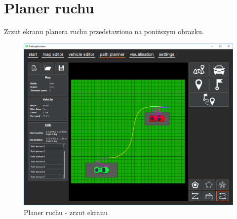 \documentclass[a4paper,11pt,twoside]{report}
\theoremstyle{definition}
\begin{document}
\section{Planer ruchu}

Zrzut ekranu planera ruchu przedstawiono na poniższym obrazku.

\begin{figure}[h!]
\centering
\includegraphics[scale=0.5]{instructionPathPlanner}
\caption[Planer ruchu - zrzut ekranu]{Planer ruchu - zrzut ekranu}
\end{figure}
\end{document}
